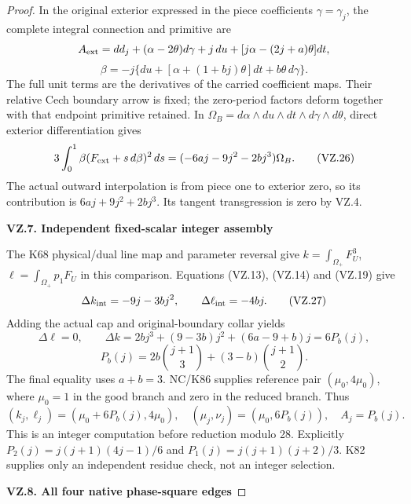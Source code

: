 \begin{proof}
In the original exterior expressed in the piece coefficients
\(\gamma=\gamma_j\), the complete integral connection and primitive are
\[
 A_{\rm ext}=dd_j+(\alpha-2\theta)d\gamma+j\,du+
                        [j\alpha-(2j+a)\theta]dt,
\]
\[
 \beta=-j\{du+[\alpha+(1+bj)\theta]dt+b\theta\,d\gamma\}.
                                                               \tag{VZ.25}
\]
The full unit terms are the derivatives of the carried coefficient
maps. Their relative Cech boundary arrow is fixed; the zero-period
factors deform together with that endpoint primitive retained.
In \(\Omega_B=d\alpha\wedge du\wedge dt\wedge d\gamma\wedge d\theta\),
direct exterior differentiation gives
\[
 3\int_0^1\beta(F_{\rm ext}+s\,d\beta)^2\,ds
          =(-6aj-9j^2-2bj^3)\Omega_B.                \tag{VZ.26}
\]
The actual outward interpolation is from piece one to exterior zero,
so its contribution is \(6aj+9j^2+2bj^3\). Its tangent transgression
is zero by VZ.4.

\par

\medskip\noindent\textbf{VZ.7. Independent fixed-scalar integer assembly}

\par\nobreak

The K68 physical/dual line map and parameter reversal give
\(k=\int_{\Omega_+}F_U^3\), \(\ell=\int_{\Omega_+}p_1F_U\)
in this comparison. Equations (VZ.13), (VZ.14) and (VZ.19) give
\[
 \Delta k_{\rm int}=-9j-3bj^2,\qquad
 \Delta\ell_{\rm int}=-4bj.                          \tag{VZ.27}
\]
Adding the actual cap and original-boundary collar yields
\[
 \Delta\ell=0,\qquad
 \Delta k=2bj^3+(9-3b)j^2+(6a-9+b)j=6P_b(j),
\]
\[
 P_b(j)=2b\binom{j+1}{3}+(3-b)\binom{j+1}{2}.        \tag{VZ.28}
\]
The final equality uses \(a+b=3\). NC/K86 supplies reference pair
\((\mu_0,4\mu_0)\), where \(\mu_0=1\) in the good branch and zero
in the reduced branch. Thus
\[
 (k_j,\ell_j)=(\mu_0+6P_b(j),4\mu_0),\quad
 (\mu_j,\nu_j)=(\mu_0,6P_b(j)),\quad A_j=P_b(j).       \tag{VZ.29}
\]
This is an integer computation before reduction modulo 28.
Explicitly \(P_2(j)=j(j+1)(4j-1)/6\) and
\(P_1(j)=j(j+1)(j+2)/3\). K82 supplies only an independent
residue check, not an integer selection.

\par

\medskip\noindent\textbf{VZ.8. All four native phase-square edges}

\par\nobreak


\end{proof}
